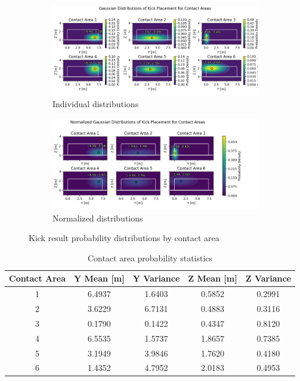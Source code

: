 \documentclass[12pt]{article}
\begin{document}
\begin{figure}[H]
    \begin{subfigure}[b]{0.99\textwidth}
        \centering
        \includegraphics[width=\textwidth]{Problem 2/out/contact_area_probability_dist.png}
        \caption{Individual distributions}
        \label{fig:p2-distributions}
    \end{subfigure}
    \begin{subfigure}[b]{0.99\textwidth}
        \centering
        \includegraphics[width=\textwidth]{Problem 2/out/normalized_contact_area_probability_dist.png}
        \caption{Normalized distributions}
        \label{fig:p2-normalized-distributions}
    \end{subfigure}
    \caption{Kick result probability distributions by contact area}
    \label{fig:p2-both-distributions}
\end{figure}

\begin{table}[H]
    \centering
    \caption{Contact area probability statistics}
    \label{tab:p2-distribution-stats}
    \begin{tabular}{|c|c|c|c|c|}
        \hline
        \textbf{Contact Area} & \textbf{Y Mean} [m] & \textbf{Y Variance} & \textbf{Z Mean} [m] & \textbf{Z Variance}\\
        \hline
        1 & 6.4937 & 1.6403 & 0.5852 & 0.2991\\
        \hline
        2 & 3.6229 & 6.7131 & 0.4883 & 0.3116\\
        \hline
        3 & 0.1790 & 0.1422 & 0.4347 & 0.8120\\
        \hline
        4 & 6.5535 & 1.5737 & 1.8657 & 0.7385\\
        \hline
        5 & 3.1949 & 3.9846 & 1.7620 & 0.4180\\
        \hline
        6 & 1.4352 & 4.7952 & 2.0183 & 0.4953\\
        \hline
    \end{tabular}
\end{table}
\end{document}
